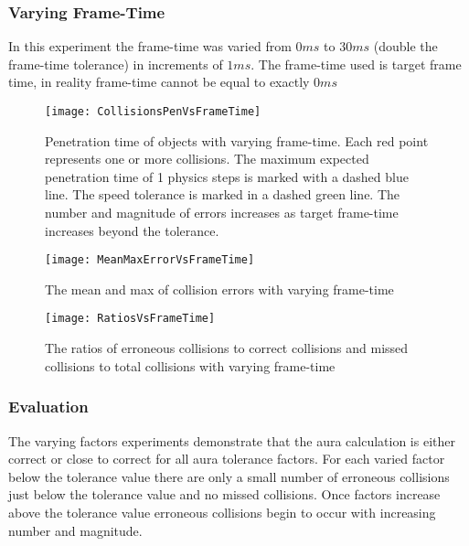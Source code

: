 \subsubsection{Varying Frame-Time}

In this experiment the frame-time was varied from $0ms$ to $30ms$ (double the frame-time tolerance) in increments of $1ms$.
The frame-time used is target frame time, in reality frame-time cannot be equal to exactly $0ms$

\begin{figure}[!t]
\centering
\texttt{[image: CollisionsPenVsFrameTime]}
\caption{Penetration time of objects with varying frame-time. Each red point represents one or more collisions. The maximum expected penetration time of 1 physics steps is marked with a dashed blue line. The speed tolerance is marked in a dashed green line. The number and magnitude of errors increases as target frame-time increases beyond the tolerance.}
\label{fig_CollisionsPenVsFrameTime}
\end{figure}

\begin{figure}[!t]
\centering
\texttt{[image: MeanMaxErrorVsFrameTime]}
\caption{The mean and max of collision errors with varying frame-time}
\label{fig_MeanMaxErrorVsFrameTime}
\end{figure}

\begin{figure}[!t]
\centering
\texttt{[image: RatiosVsFrameTime]}
\caption{The ratios of erroneous collisions to correct collisions and missed collisions to total collisions with varying frame-time}
\label{fig_RatiosVsFrameTime}
\end{figure}

\subsubsection{Evaluation}
The varying factors experiments demonstrate that the aura calculation is either correct or close to correct for all aura tolerance factors. For each varied factor below the tolerance value there are only a small number of erroneous collisions just below the tolerance value and no missed collisions. Once factors increase above the tolerance value erroneous collisions begin to occur with increasing number and magnitude.



